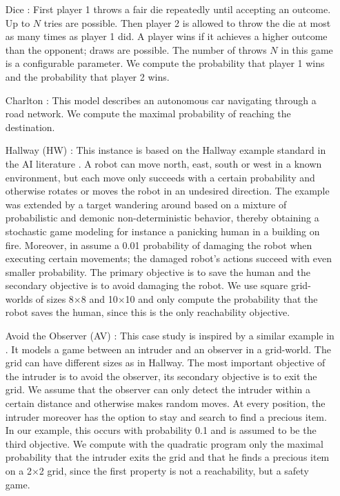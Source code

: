 \begin{itemize}
	\item[Dice \cite{dice}:] First player 1 throws a fair die repeatedly until accepting an outcome. Up to $N$
	 tries are possible. Then player 2 is allowed to throw the die at most as many times as player 1 did.
	A player wins if it achieves a higher outcome than the opponent; draws are possible.
	The number of throws $N$ in this game is a configurable parameter.
	We compute the probability that player 1 wins and the probability that player 2 wins.
	\item[Charlton \cite{charlton}:] This model describes an autonomous car navigating through a road network. We compute the maximal probability of reaching the destination.
	\item[Hallway (HW) \cite{cav20}:] This instance is based on the Hallway example standard in the AI literature \cite{LCK95,CCGK16}. A robot can move north, east, south or west in a known environment, but each move only succeeds with a certain probability and otherwise rotates or moves the robot in an undesired direction. The example was extended by a target wandering around based on a mixture of probabilistic and demonic non-deterministic behavior, thereby obtaining a stochastic game modeling for instance a panicking human in a building on fire. Moreover, in  assume a 0.01 probability of damaging the robot when executing certain movements; the damaged robot's actions succeed with even smaller probability. The primary objective is to save the human and the secondary objective is to avoid damaging the robot. We use square grid-worlds of sizes 8$\times$8 and 10$\times$10 and only compute the probability that the robot saves the human, since this is the only reachability objective.
	\item[Avoid the Observer (AV) \cite{cav20}:] This case study is inspired by a similar example in \cite{CC15}. It models a game between an intruder and an observer in a grid-world. 
	The grid can have different sizes as in Hallway.
	The most important objective of the intruder is to avoid the observer, its secondary objective is to exit the grid. We assume that the observer can only detect the intruder within a certain distance and otherwise makes random moves. At every position, the intruder moreover has the option to stay and search to find a precious item. In our example, this occurs with probability 0.1 and is assumed to be the third objective. We compute with the quadratic program only the maximal probability that the intruder exits the grid and that he finds a precious item on a 2$\times$2 grid, since the first property is not a reachability, but a safety game.
\end{itemize}

